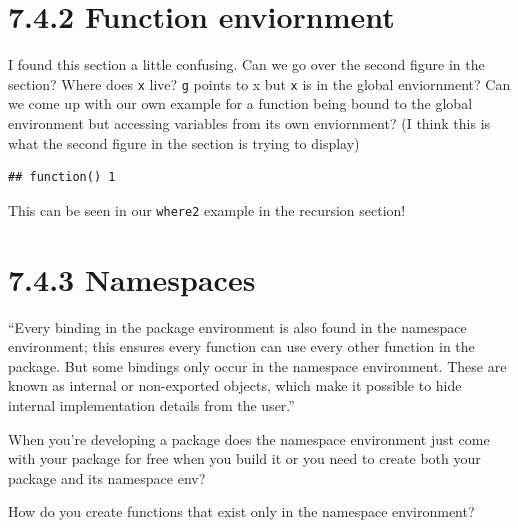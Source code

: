 \documentclass[]{book}
\newenvironment{Shaded}{\begin{snugshade}}{\end{snugshade}}
\newcommand{\ControlFlowTok}[1]{\textcolor[rgb]{0.13,0.29,0.53}{\textbf{#1}}}
\newcommand{\DecValTok}[1]{\textcolor[rgb]{0.00,0.00,0.81}{#1}}
\newcommand{\KeywordTok}[1]{\textcolor[rgb]{0.13,0.29,0.53}{\textbf{#1}}}
\newcommand{\NormalTok}[1]{#1}
\newcommand{\OperatorTok}[1]{\textcolor[rgb]{0.81,0.36,0.00}{\textbf{#1}}}
\newcommand{\StringTok}[1]{\textcolor[rgb]{0.31,0.60,0.02}{#1}}
\begin{document}
\hypertarget{function-enviornment}{%
\section*{7.4.2 Function enviornment}\label{function-enviornment}}

I found this section a little confusing. Can we go over the second figure in the section? Where does \texttt{x} live? \texttt{g} points to x but \texttt{x} is in the global enviornment? Can we come up with our own example for a function being bound to the global environment but accessing variables from its own enviornment? (I think this is what the second figure in the section is trying to display)

\begin{Shaded}
\end{Shaded}

\begin{verbatim}
## function() 1
\end{verbatim}

This can be seen in our \texttt{where2} example in the recursion section!

\hypertarget{namespaces}{%
\section*{7.4.3 Namespaces}\label{namespaces}}

``Every binding in the package environment is also found in the namespace environment; this ensures every function can use every other function in the package. But some bindings only occur in the namespace environment. These are known as internal or non-exported objects, which make it possible to hide internal implementation details from the user.''

When you're developing a package does the namespace environment just come with your package for free when you build it or you need to create both your package and its namespace env?

How do you create functions that exist only in the namespace environment?
\end{document}
